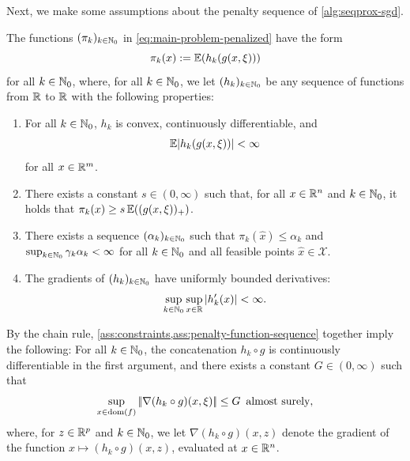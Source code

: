 Next, we make some assumptions about the penalty sequence of \cref{alg:seqprox-sgd}.
\begin{assumption}
    \label{ass:penalty-function-sequence}
    The functions $(\pi_k)_{k\in\mathbb{N}_0}$ in \eqref{eq:main-problem-penalized} have the form
    \[
        \pi_k(x) := \mathbb{E}(h_k(g(x, \xi)))
    \]
    for all $k\in\mathbb{N}_0$, where, for all $k\in\mathbb{N}_0$,
    we let $(h_k)_{k\in\mathbb{N}_0}$ be any sequence of functions from
    $\mathbb{R}$ to $\mathbb{R}$ with the following properties:
    \begin{enumerate}
        \item For all $k\in\mathbb{N}_0$, $h_k$ is convex, continuously differentiable, and
        \[
            \mathbb{E}| h_k(g(x, \xi)) | < \infty
        \]
        for all $x\in\mathbb{R}^m$.
        \item There exists a constant $s\in(0,\infty)$ such that, for all $x\in\mathbb{R}^n$ and $k\in\mathbb{N}_0$,
        it holds that $\pi_k(x) \geq s \, \mathbb{E}((g(x, \xi))_+)$.
        \item There exists a sequence $(\alpha_k)_{k\in\mathbb{N}_0}$ such that
        $\pi_k(\hat{x}) \leq \alpha_k$ and $\sup_{k\in\mathbb{N}_0} \gamma_k\alpha_k < \infty$
        for all $k\in\mathbb{N}_0$ and all feasible points $\hat{x}\in\mathcal{X}$.
        \item The gradients of $(h_k)_{k\in\mathbb{N}_0}$ have uniformly bounded derivatives:
            \[
                \sup_{k\in\mathbb{N}_0}\sup_{x\in\mathbb{R}} | h^\prime_k(x) | < \infty.
            \]  
    \end{enumerate}
\end{assumption}
By the chain rule, \cref{ass:constraints,ass:penalty-function-sequence} together imply the following:
For all $k\in\mathbb{N}_0$, the concatenation $h_k\circ g$ is
continuously differentiable in the first argument, and
there exists a constant $G\in(0,\infty)$ such that
\begin{equation}
    \label{eq:norm-bound-penalty-gradient}
    \sup_{x\in \operatorname{dom}(f)} |\!|\nabla (h_k \circ g)(x, \xi)|\!| \leq G \enspace\text{almost surely},  
\end{equation}
where, for $z\in\mathbb{R}^p$ and $k\in\mathbb{N}_0$, we let $\nabla (h_k\circ g)(x, z)$ denote the
gradient of the function $x\mapsto (h_k\circ g)(x, z)$, evaluated at $x\in\mathbb{R}^n$.

